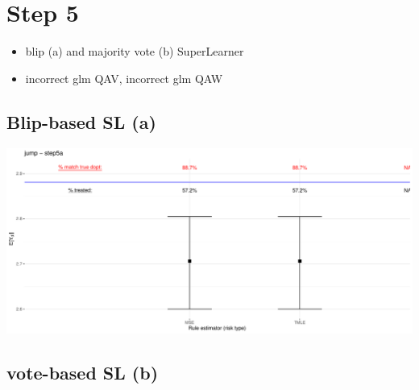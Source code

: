 \documentclass[11pt]{article}\usepackage[]{graphicx}\usepackage[]{color}
\makeatletter
\def\maxwidth{ %
  \ifdim\Gin@nat@width>\linewidth
    \linewidth
  \else
    \Gin@nat@width
  \fi
}
\makeatother
\begin{document}
\section{Step 5}

\begin{itemize}
\item blip (a) and majority vote (b) SuperLearner
\item incorrect glm QAV, incorrect glm QAW
\end{itemize}



\subsection{Blip-based SL (a)}

\includegraphics[width=\maxwidth]{figure/ODTR_DGP_jump_step5a-1} 
\begin{table}[ht]
\centering
{}
\caption{jump - step5a} 
\end{table}


\subsection{vote-based SL (b)}
\end{document}
